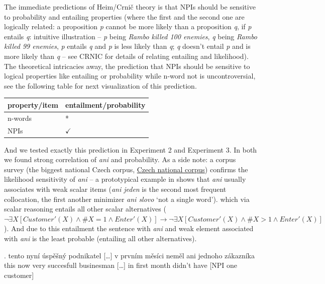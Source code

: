 \documentclass[12pt]{scrartcl}
\begin{document}
The immediate predictions of Heim/Crnič theory is that NPIs should be sensitive to probability and entailing properties (where the first and the second one are logically related: a proposition \textit{p} cannot be more likely than a proposition \textit{q}, if \textit{p} entails \textit{q}: intuitive illustration -- \textit{p} being \textit{Rambo killed 100 enemies}, \textit{q} being \textit{Rambo killed 99 enemies}, \textit{p} entails \textit{q} and \textit{p} is less likely than \textit{q}; \textit{q} doesn't entail \textit{p} and is more likely than \textit{q} -- see CRNIC for details of relating entailing and likelihood). The theoretical intricacies away, the prediction that NPIs should be sensitive to logical properties like entailing or probability while n-word not is uncontroversial, see the following table for next visualization of this prediction.

\begin{longtable}[]{@{}ll@{}}
\toprule
property/item & entailment/probability\tabularnewline
\midrule
\endhead
n-words & *\tabularnewline
NPIs & \(\checkmark\)\tabularnewline
\bottomrule
\end{longtable}


And we tested exactly this prediction in Experiment 2 and Experiment 3. In both we found strong correlation of \emph{ani} and probability. As a side note: a corpus survey (the biggest national Czech corpus,  \href{https://korpus.cz/}{Czech national corpus}) confirms the likelihood sensitivity of \textit{ani} -- a prototypical example in \Next shows that \textit{ani} usually associates with weak scalar items (\textit{ani jeden} is the second most frequent collocation, the first another minimizer \textit{ani slovo} `not a single word'). which via scalar reasoning entails all other scalar alternatives ($\neg \exists X[Customer'(X) \wedge \#X=1 \wedge Enter'(X)] \rightarrow \neg \exists X[Customer'(X) \wedge \#X>1 \wedge Enter'(X)]$). And due to this entailment the sentence with \textit{ani} and weak element associated with \textit{ani} is the least probable (entailing all other alternatives).

\ex. tento nyní úspěšný podnikatel {[}\ldots{}{]} v prvním měsíci neměl
ani jednoho zákazníka\\
this now very succesfull businesman {[}\ldots{}{]} in first month didn't
have {[}NPI one customer{]}
\end{document}
